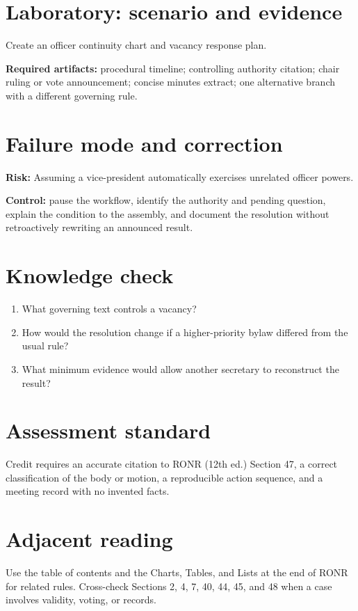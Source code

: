 \documentclass[11pt]{article}
\begin{document}
\section{Laboratory: scenario and evidence}
Create an officer continuity chart and vacancy response plan.

\textbf{Required artifacts:} procedural timeline; controlling authority citation; chair ruling or vote announcement; concise minutes extract; one alternative branch with a different governing rule.

\section{Failure mode and correction}
\textbf{Risk:} Assuming a vice-president automatically exercises unrelated officer powers.

\textbf{Control:} pause the workflow, identify the authority and pending question, explain the condition to the assembly, and document the resolution without retroactively rewriting an announced result.

\section{Knowledge check}
\begin{enumerate}[leftmargin=*,itemsep=4pt]
\item What governing text controls a vacancy?
\item How would the resolution change if a higher-priority bylaw differed from the usual rule?
\item What minimum evidence would allow another secretary to reconstruct the result?
\end{enumerate}

\section{Assessment standard}
Credit requires an accurate citation to RONR (12th ed.) Section 47, a correct classification of the body or motion, a reproducible action sequence, and a meeting record with no invented facts.

\section{Adjacent reading}
Use the table of contents and the Charts, Tables, and Lists at the end of RONR for related rules. Cross-check Sections 2, 4, 7, 40, 44, 45, and 48 when a case involves validity, voting, or records.
\end{document}
